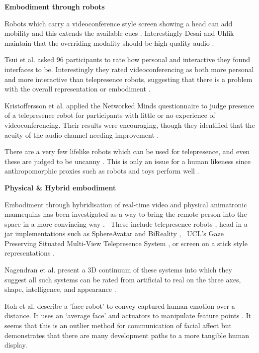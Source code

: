 \textbf{Embodiment through robots}

                    Robots which carry a videoconference style screen showing a head can add mobility and this extends the available cues \cite{Adalgeirsson2010, Lee2011, Tsui2011, Paulos1998, Kristoffersson2013}. Interestingly Desai and Uhlik maintain that the overriding modality should be high quality audio \cite{Desai2011}.\par
                    Tsui et al. asked 96 participants to rate how personal and interactive they found interfaces to be. Interestingly they rated videoconferencing as both more personal and more interactive than telepresence robots, suggesting that there is a problem with the overall representation or embodiment \cite{Tsui2012}.\par
                    Kristoffersson et al. applied the Networked Minds questionnaire to judge presence of a telepresence robot for participants with little or no experience of videoconferencing. Their results were encouraging, though they identified that the acuity of the audio channel needing improvement \cite{Kristoffersson2011}.\par
                    There are a very few lifelike robots which can be used for telepresence, and even these are judged to be uncanny \cite{Sakamoto2007}. This is only an issue for a human likeness since anthropomorphic proxies such as robots and toys perform well \cite{Mori1970}.\par
                    
 \textbf{Physical \& Hybrid embodiment}
 
                    Embodiment through hybridisation of real-time video and physical animatronic mannequins has been investigated as a way to bring the remote person into the space in a more convincing way \cite{Lincoln2009, Lincoln2010, Raskar2001}. \ These include telepresence robots \cite{Lee2011, Sakamoto2007, Tsui2011}, head in a jar implementations such as SphereAvatar \cite{Oyekoya2012, Pan2014, Pan2012} and BiReality \cite{Jouppi2004}, \ UCL's Gaze Preserving Situated Multi-View Telepresence System \cite{Pan2014}, or screen on a stick style representations \cite{Kristoffersson2013}.\par  
                    Nagendran et al. present a 3D continuum of these systems into which they suggest all such systems can be rated from artificial to real on the three axes, shape, intelligence, and appearance \cite{Nagendran2012}.\par
                    Itoh et al. describe a 'face robot' to convey captured human emotion over a distance. It uses an `average face' and actuators to manipulate feature points \cite{Itoh2005}. It seems that this is an outlier method for communication of facial affect but demonstrates that there are many development paths to a more tangible human display.\par 
                    

